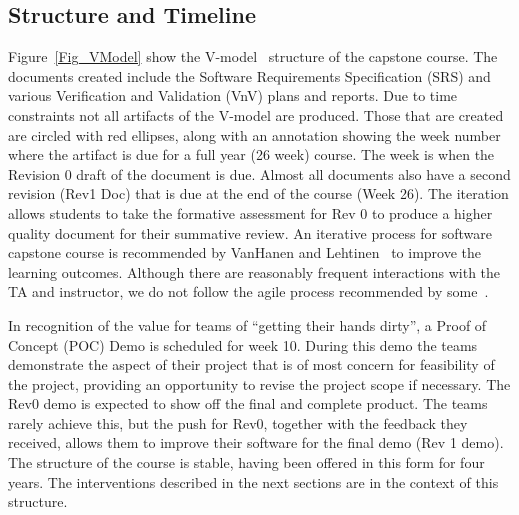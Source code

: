 \documentclass[10pt, conference]{IEEEtran}
\begin{document}
\subsection{Structure and Timeline} \label{Sec_Structure}

Figure~\ref{Fig_VModel} show the V-model~\cite{ForsbergAndMooz1991} structure of
the capstone course. The documents created include the Software Requirements
Specification (SRS) and various Verification and Validation (VnV) plans and
reports. Due to time constraints not all artifacts of the V-model are produced.
Those that are created are circled with red ellipses, along with an annotation
showing the week number where the artifact is due for a full year (26 week)
course. The week is when the Revision 0 draft of the document is due.  Almost
all documents also have a second revision (Rev1 Doc) that is due at the end of
the course (Week 26). The iteration allows students to take the formative
assessment for Rev 0 to produce a higher quality document for their summative
review. An iterative process for software capstone course is recommended by
VanHanen and Lehtinen~\cite{vanhanenSoftwareEngineeringProblems2014} to improve
the learning outcomes. Although there are reasonably frequent interactions with
the TA and instructor, we do not follow the agile process recommended by
some~\cite{stettinaAcademicEducationSoftware2013,
bastarricaWhatCanStudents2017}.

In recognition of the value for teams of ``getting their hands dirty'',
a Proof of Concept (POC) Demo is scheduled for week 10. During this demo the
teams demonstrate the aspect of their project that is of most concern for
feasibility of the project, providing an opportunity to revise the project scope
if necessary. The Rev0 demo is expected to show off the final and complete
product. The teams rarely achieve this, but the push for Rev0, together with the
feedback they received, allows them to improve their software for the final demo
(Rev 1 demo). The structure of the course is stable, having been offered in this
form for four years. The interventions described in the next sections are in the
context of this structure. 
\end{document}
